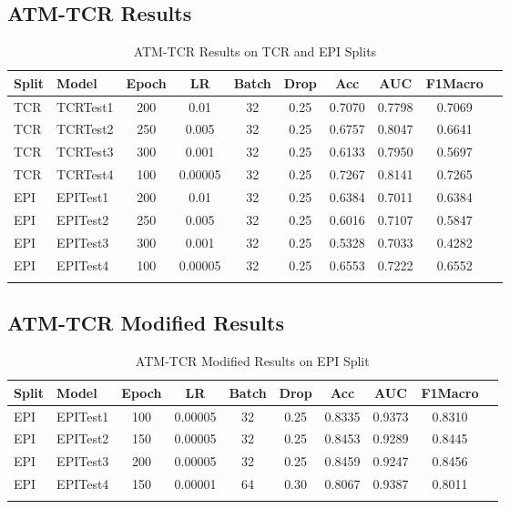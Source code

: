 \documentclass[11pt,a4paper]{article}
\begin{document}
\subsection{ATM-TCR Results}
\begin{longtable}{|l|l|c|c|c|c|c|c|c|c|}
\hline
\textbf{Split} & \textbf{Model} & \textbf{Epoch} & \textbf{LR} & \textbf{Batch} & \textbf{Drop} & \textbf{Acc} & \textbf{AUC} & \textbf{F1Macro} \\ \hline
TCR & TCRTest1 & 200 & 0.01 & 32 & 0.25 & 0.7070 & 0.7798 & 0.7069 \\ \hline
TCR & TCRTest2 & 250 & 0.005 & 32 & 0.25 & 0.6757 & 0.8047 & 0.6641 \\ \hline
TCR & TCRTest3 & 300 & 0.001 & 32 & 0.25 & 0.6133 & 0.7950 & 0.5697 \\ \hline
TCR & TCRTest4 & 100 & 0.00005 & 32 & 0.25 & 0.7267 & 0.8141 & 0.7265 \\ \hline
EPI & EPITest1 & 200 & 0.01 & 32 & 0.25 & 0.6384 & 0.7011 & 0.6384 \\ \hline
EPI & EPITest2 & 250 & 0.005 & 32 & 0.25 & 0.6016 & 0.7107 & 0.5847 \\ \hline
EPI & EPITest3 & 300 & 0.001 & 32 & 0.25 & 0.5328 & 0.7033 & 0.4282 \\ \hline
EPI & EPITest4 & 100 & 0.00005 & 32 & 0.25 & 0.6553 & 0.7222 & 0.6552 \\ \hline
\caption{ATM-TCR Results on TCR and EPI Splits}
\label{table:atm-tcr}
\end{longtable}

\subsection{ATM-TCR Modified Results}
\begin{longtable}{|l|l|c|c|c|c|c|c|c|c|}
\hline
\textbf{Split} & \textbf{Model} & \textbf{Epoch} & \textbf{LR} & \textbf{Batch} & \textbf{Drop} & \textbf{Acc} & \textbf{AUC} & \textbf{F1Macro} \\ \hline
EPI & EPITest1 & 100 & 0.00005 & 32 & 0.25 & 0.8335 & 0.9373 & 0.8310 \\ \hline
EPI & EPITest2 & 150 & 0.00005 & 32 & 0.25 & 0.8453 & 0.9289 & 0.8445 \\ \hline
EPI & EPITest3 & 200 & 0.00005 & 32 & 0.25 & 0.8459 & 0.9247 & 0.8456 \\ \hline
EPI & EPITest4 & 150 & 0.00001 & 64 & 0.30 & 0.8067 & 0.9387 & 0.8011 \\ \hline
\caption{ATM-TCR Modified Results on EPI Split}
\label{table:atm-tcr-modified}
\end{longtable}
\end{document}
